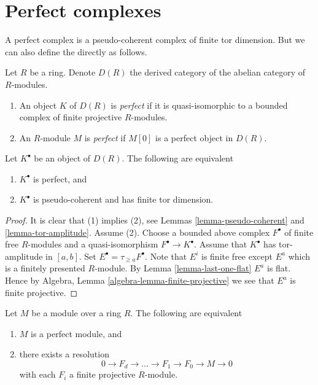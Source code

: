 \section{Perfect complexes}
\label{section-perfect}

\noindent
A perfect complex is a pseudo-coherent complex of finite tor dimension.
But we can also define the directly as follows.

\begin{definition}
\label{definition-perfect}
Let $R$ be a ring. Denote $D(R)$ the derived category of the abelian
category of $R$-modules.
\begin{enumerate}
\item An object $K$ of $D(R)$ is {\it perfect} if it is quasi-isomorphic
to a bounded complex of finite projective $R$-modules.
\item An $R$-module $M$ is {\it perfect} if $M[0]$ is a perfect object
in $D(R)$.
\end{enumerate}
\end{definition}

\begin{lemma}
\label{lemma-perfect}
Let $K^\bullet$ be an object of $D(R)$. The following are equivalent
\begin{enumerate}
\item $K^\bullet$ is perfect, and
\item $K^\bullet$ is pseudo-coherent and has finite tor dimension.
\end{enumerate}
\end{lemma}

\begin{proof}
It is clear that (1) implies (2), see
Lemmas \ref{lemma-pseudo-coherent} and \ref{lemma-tor-amplitude}.
Assume (2). Choose a bounded above complex $F^\bullet$
of finite free $R$-modules and a quasi-isomorphism $F^\bullet \to K^\bullet$.
Assume that $K^\bullet$ has tor-amplitude in $[a, b]$.
Set $E^\bullet = \tau_{\geq a}F^\bullet$. Note that $E^i$ is finite free
except $E^a$ which is a finitely presented $R$-module.
By
Lemma \ref{lemma-last-one-flat}
$E^a$ is flat. Hence by
Algebra, Lemma \ref{algebra-lemma-finite-projective}
we see that $E^a$ is finite projective.
\end{proof}

\begin{lemma}
\label{lemma-perfect-module}
Let $M$ be a module over a ring $R$. The following are equivalent
\begin{enumerate}
\item $M$ is a perfect module, and
\item there exists a resolution
$$
0 \to F_d \to \ldots \to F_1 \to F_0 \to M \to 0
$$
with each $F_i$ a finite projective $R$-module.
\end{enumerate}
\end{lemma}

